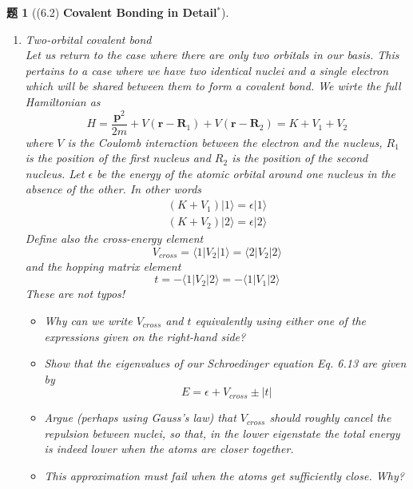 \documentclass[UTF8,10pt,a4paper]{article}
\theoremstyle{Problem}
\newtheorem{prob}{题}
\theoremstyle{Solution}
\begin{document}
\begin{prob}[(6.2) \textbf{Covalent Bonding in Detail$^*$}]
\begin{enumerate}
\begin{itemize}
        \end{itemize}
        \item[(b)] \textit{Two-orbital covalent bond}\\
        Let us return to the case where there are only two orbitals in our basis. This pertains to a case where we have two identical nuclei and a single electron which will be shared between them to form a covalent bond. We wirte the full Hamiltonian as
        \[
            H=\frac{\bm{p}^2}{2m}+V(\bm{r}-\bm{R}_1)+V(\bm{r}-\bm{R}_2)=K+V_1+V_2
        \]
        where $V$ is the Coulomb interaction between the electron and the nucleus, $R_1$ is the position of the first nucleus and $R_2$ is the position of the second nucleus. Let $\epsilon$ be the energy of the atomic orbital around one nucleus in the absence of the other. In other words
        \begin{gather*}
            (K+V_1)\lvert 1\rangle=\epsilon\lvert 1\rangle\\
            (K+V_2)\lvert 2\rangle=\epsilon\lvert 2\rangle
        \end{gather*}
        Define also the cross-energy element
        \[
            V_{cross}=\langle 1\lvert V_2\rvert 1\rangle=\langle 2\lvert V_2\rvert 2\rangle
        \]
        and the hopping matrix element
        \[
            t=-\langle 1\lvert V_2\rvert 2\rangle=-\langle 1\lvert V_1\rvert 2\rangle
        \]
        These are not typos!
        \begin{itemize}
            \item[$\triangleright$] Why can we write $V_{cross}$ and $t$ equivalently using either one of the expressions given on the right-hand side?
            \item[$\triangleright$] Show that the eigenvalues of our Schroedinger equation Eq. 6.13 are given by
            \[
                E=\epsilon+V_{cross}\pm|t|
            \]
            \item[$\triangleright$] Argue (perhaps using Gauss's law) that $V_{cross}$ should roughly cancel the repulsion between nuclei, so that, in the lower eigenstate the total energy is indeed lower when the atoms are closer together.
            \item[$\triangleright$] This approximation must fail when the atoms get sufficiently close. Why?
        \end{itemize}
    \end{enumerate}
\end{prob}
\end{document}
